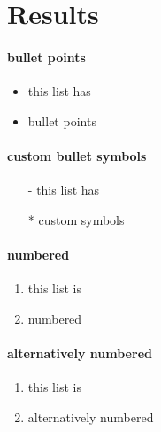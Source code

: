 \section{Results}\label{sec:results}
\paragraph{bullet points}
\begin{itemize}
\item this list has
\item bullet points
\end{itemize}

\paragraph{custom bullet symbols}
\begin{itemize}
\item[-] this list has
\item[*] custom symbols
\end{itemize}

\paragraph{numbered}
\begin{enumerate}
\item this list is
\item numbered
\end{enumerate}

\paragraph{alternatively numbered}
\begin{enumerate}[I]
\item this list is
\item alternatively numbered
\end{enumerate}
